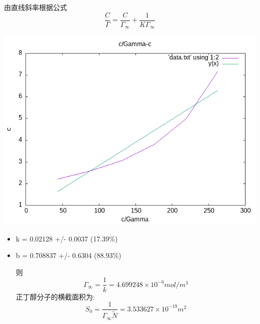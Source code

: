 \documentclass[11pt]{report}
\begin{document}
由直线斜率根据公式
\[
   \frac{C}{\Gamma}=\frac{C}{\Gamma_{\infty}}+\frac{1}{K\Gamma_{\infty}}
   \]
\begin{center}
\includegraphics[width=.9\linewidth]{../img/out.png}
\end{center}


\begin{itemize}
\item k               = 0.02128          +/- 0.0037       (17.39\%)
\item b               = 0.708837         +/- 0.6304       (88.93\%)

则
\[
   \Gamma_{\infty}=\frac{1}{k}=4.699248\times 10^{-6} mol/m^{3}
   \]
正丁醇分子的横截面积为:
\[
   S_{0}=\frac{1}{\Gamma_{\infty}\widetilde{N}}=3.533627\times 10^{-19} m^{2}
   \]
\end{itemize}
\end{document}
